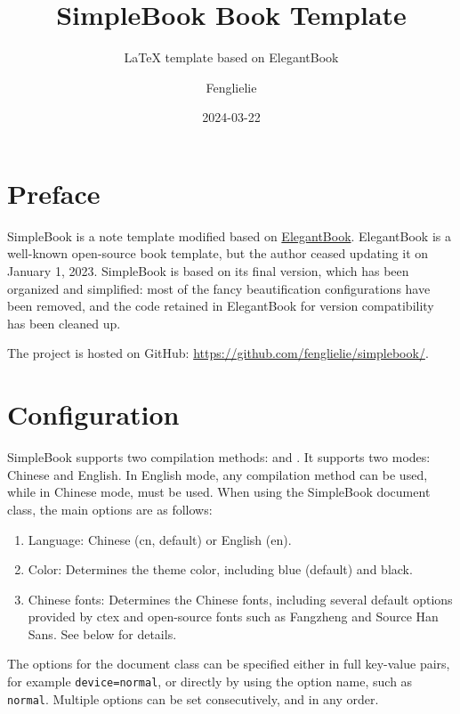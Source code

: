 \documentclass[lang=en,11pt]{../simplebook}
\title{SimpleBook Book Template}
\subtitle{\LaTeX{} template based on ElegantBook}
\author{Fenglielie}
\date{2024-03-22}
\begin{document}
\maketitle

\frontmatter

\chapter*{Preface}

SimpleBook is a note template modified based on \href{https://github.com/ElegantLaTeX/ElegantBook}{ElegantBook}. ElegantBook is a well-known open-source book template,
but the author ceased updating it on January 1, 2023.
SimpleBook is based on its final version, which has been organized and simplified: most of the fancy beautification configurations have been removed,
and the code retained in ElegantBook for version compatibility has been cleaned up.

The project is hosted on GitHub: \href{https://github.com/fenglielie/simplebook/}{https://github.com/fenglielie/simplebook/}.


\tableofcontents

\mainmatter

\chapter{Configuration}

SimpleBook supports two compilation methods:  and .
It supports two modes: Chinese and English. In English mode, any compilation method can be used, while in Chinese mode,  must be used.
When using the SimpleBook document class, the main options are as follows:

\begin{enumerate}
    \item Language: Chinese (cn, default) or English (en).
    \item Color: Determines the theme color, including blue (default) and black.
    \item Chinese fonts: Determines the Chinese fonts, including several default options provided by ctex and open-source fonts such as Fangzheng and Source Han Sans. See below for details.
\end{enumerate}


\begin{remark}
    The options for the document class can be specified either in full key-value pairs, for example \lstinline{device=normal},
    or directly by using the option name, such as \lstinline{normal}. Multiple options can be set consecutively, and in any order.
\end{remark}
\end{document}
